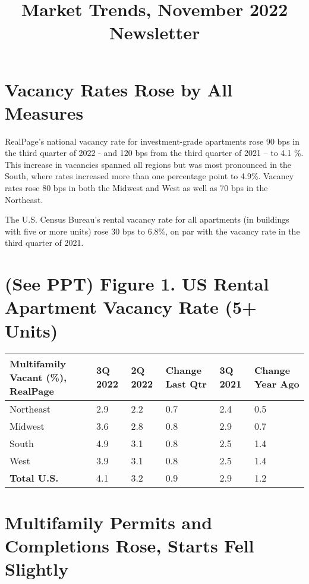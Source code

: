 \documentclass{article}
\title{Market Trends, November 2022 Newsletter}
\author{}
\date{}
\begin{document}
\maketitle

\section*{\normalsize Vacancy Rates Rose by All Measures}

RealPage’s national vacancy rate for investment-grade apartments rose 90 bps in the third quarter of 2022 - and 120 bps from the third quarter of 2021 – to 4.1 \%. This increase in vacancies spanned all regions but was most pronounced in the South, where rates increased more than one percentage point to 4.9\%. Vacancy rates rose 80 bps in both the Midwest and West as well as 70 bps in the Northeast.

\medskip

\noindent The U.S. Census Bureau’s rental vacancy rate for all apartments (in buildings with five or more units) rose 30 bps to 6.8\%, on par with the vacancy rate in the third quarter of 2021.  

\section*{\normalsize (See PPT) Figure 1. US Rental Apartment Vacancy Rate (5+ Units)}

\begin{center}
    \begin{tabular}{ |p{3cm}||p{1.5cm}|p{1.5cm}|p{1.5cm}|p{1.5cm}|p{1.5cm}|  }
    \hline
     Multifamily Vacant (\%), RealPage & \centering 3Q 2022 & \centering 2Q 2022 & \centering Change Last Qtr & \centering 3Q 2021 & Change Year Ago\\
     \hline
     Northeast & 2.9 & 2.2 & 0.7 & 2.4 & 0.5\\
     \hline
     Midwest & 3.6 & 2.8 & 0.8 & 2.9 & 0.7\\
     \hline
     South & 4.9 & 3.1 & 0.8 & 2.5 & 1.4\\
     \hline
     West & 3.9 & 3.1 & 0.8 & 2.5 & 1.4\\
     \hline
     \textbf{Total U.S.} & 4.1 & 3.2 & 0.9 & 2.9 & 1.2\\
     \hline
    \end{tabular}
\end{center}

\section*{\normalsize Multifamily Permits and Completions Rose, Starts Fell Slightly}
\end{document}
